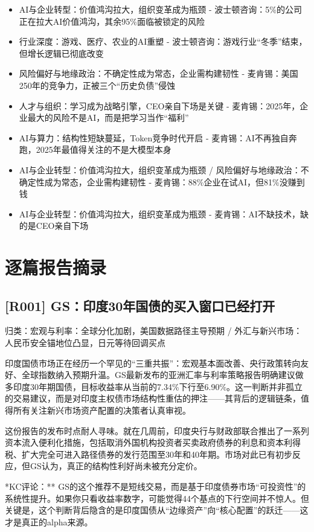\documentclass[11pt]{ctexart}
\begin{document}
\begin{itemize}
  \item [R049] AI与企业转型：价值鸿沟拉大，组织变革成为瓶颈 - 波士顿咨询：5\%的公司正在拉大AI价值鸿沟，其余95\%面临被锁定的风险
  \item [R050] 行业深度：游戏、医疗、农业的AI重塑 - 波士顿咨询：游戏行业“冬季”结束，但增长逻辑已彻底改变
  \item [R051] 风险偏好与地缘政治：不确定性成为常态，企业需构建韧性 - 麦肯锡：美国250年的竞争力，正被三个“历史负债”侵蚀
  \item [R052] 人才与组织：学习成为战略引擎，CEO亲自下场是关键 - 麦肯锡：2025年，企业最大的风险不是AI，而是把学习当作“福利”
  \item [R053] AI与算力：结构性短缺蔓延，Token竞争时代开启 - 麦肯锡：AI不再独自奔跑，2025年最值得关注的不是大模型本身
  \item [R054] AI与企业转型：价值鸿沟拉大，组织变革成为瓶颈 / 风险偏好与地缘政治：不确定性成为常态，企业需构建韧性 - 麦肯锡：88\%企业在试AI，但81\%没赚到钱
  \item [R055] AI与企业转型：价值鸿沟拉大，组织变革成为瓶颈 - 麦肯锡：AI不缺技术，缺的是CEO亲自下场
\end{itemize}
\section{逐篇报告摘录}
\subsection{[R001] GS：印度30年国债的买入窗口已经打开}
{\small\color{refgray}归类：宏观与利率：全球分化加剧，美国数据路径主导预期 / 外汇与新兴市场：人民币安全锚地位凸显，日元等待回调买点}

印度国债市场正在经历一个罕见的“三重共振”：宏观基本面改善、央行政策转向友好、全球指数纳入预期升温。GS最新发布的亚洲汇率与利率策略报告明确建议做多印度30年期国债，目标收益率从当前的7.34\%下行至6.90\%。这一判断并非孤立的交易建议，而是对印度主权债市场结构性重估的押注——其背后的逻辑链条，值得所有关注新兴市场资产配置的决策者认真审视。

这份报告的发布时点耐人寻味。就在几周前，印度央行与财政部联合推出了一系列资本流入便利化措施，包括取消外国机构投资者买卖政府债券的利息和资本利得税、扩大完全可进入路径债券的发行范围至30年和40年期。市场对此已有初步反应，但GS认为，真正的结构性利好尚未被充分定价。

*KC评论：** GS的这个推荐不是短线交易，而是基于印度债券市场“可投资性”的系统性提升。如果你只看收益率数字，可能觉得44个基点的下行空间并不惊人。但关键是，这个判断背后隐含的是印度国债从“边缘资产”向“核心配置”的跃迁——这才是真正的alpha来源。
\end{document}
